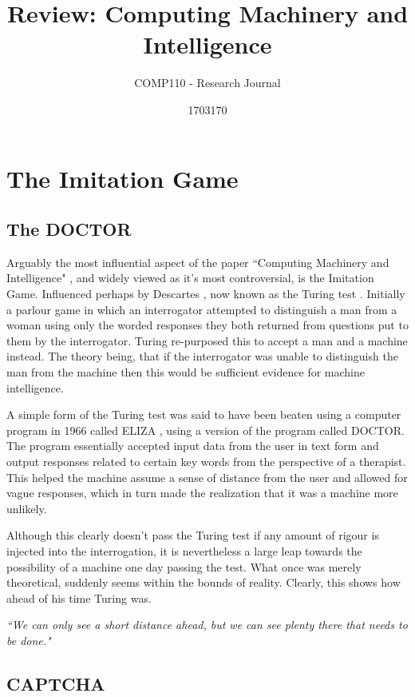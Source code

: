 \documentclass{scrartcl}
\title{Review: Computing Machinery and Intelligence
}
\subtitle{COMP110 - Research Journal}
\author{1703170}
\begin{document}
\maketitle

\section{The Imitation Game}

\subsection{The DOCTOR}

Arguably the most influential aspect of the paper \textquotedblleft Computing Machinery and Intelligence" \cite{turing1950computing:1}, and widely viewed as it's most controversial, is the Imitation Game. Influenced perhaps by Descartes \cite{descartes1996discourse:6}, now known as the Turing test \cite{suchman1987plans:7}. Initially a parlour game in which an interrogator attempted to distinguish a man from a woman using only the worded responses they both returned from questions put to them by the interrogator. Turing re-purposed this to accept a man and a machine instead. The theory being, that if the interrogator was unable to distinguish the man from the machine then this would be sufficient evidence for machine intelligence. \par
A simple form of the Turing test was said to have been beaten using a computer program in 1966 called ELIZA \cite{weizenbaum1966eliza:8}, using a version of the program called DOCTOR. The program essentially accepted input data from the user in text form and output responses related to certain key words from the perspective of a therapist. This helped the machine assume a sense of distance from the user and allowed for vague responses, which in turn made the realization that it was a machine more unlikely. \par
Although this clearly doesn't pass the Turing test if any amount of rigour is injected into the interrogation, it is nevertheless a large leap towards the possibility of a machine one day passing the test. What once was merely theoretical, suddenly seems within the bounds of reality. Clearly, this shows how ahead of his time Turing was.\par 
\textit{\textquotedblleft We can only see a short distance ahead, but we can see plenty there that needs to be done."} 

\subsection{CAPTCHA}
\end{document}
